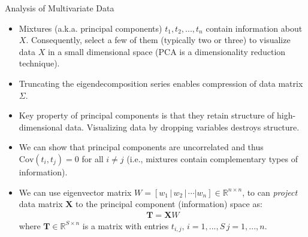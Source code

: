 \documentclass[9pt]{beamer}
\begin{document}
\begin{frame}{Analysis of Multivariate Data}

\begin{itemize}
\setlength{\itemsep}{10pt}
\item Mixtures (a.k.a. principal components) $t_1,t_2,...,t_n$ contain information about $X$. Consequently, select a few of them (typically two or three) to visualize data $X$ in a small dimensional space (PCA is a dimensionality reduction technique). 

\item Truncating the eigendecomposition series enables compression of data matrix $\Sigma$. 

\item Key property of principal components is that they retain structure of high-dimensional data. Visualizing data by dropping variables destroys structure.

\item We can show that principal components are uncorrelated and thus $\textrm{Cov}(t_i,t_j)=0$ for all $i\neq j$ (i.e., mixtures contain complementary types of information). 

\item We can use eigenvector matrix $W=[w_1\,|\,w_2\,|\,\cdots|w_n]\in \mathbb{R}^{n\times n}$, to can {\em project} data matrix $\mathbf{X}$ to the principal component (information) space as: 
\begin{align*}
\mathbf{T}=\mathbf{X}W
\end{align*}
where $\mathbf{T}\in \mathbb{R}^{S\times n}$ is a matrix with entries $t_{i,j},\,i=1,...,S\, j=1,...,n$. 

 
\end{itemize}


\end{frame}
\end{document}

